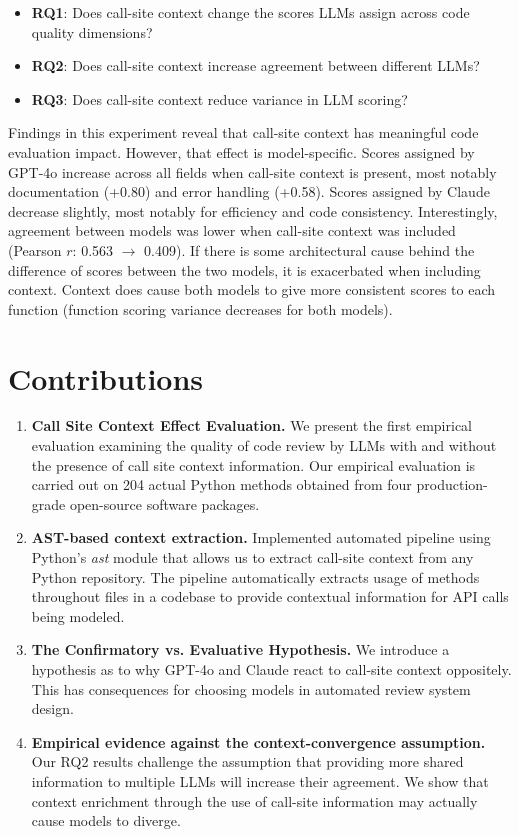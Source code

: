 \documentclass[12pt]{report}
\begin{document}
\begin{itemize}
    \item \textbf{RQ1}: Does call-site context change the scores LLMs assign across code quality dimensions?
    \item \textbf{RQ2}: Does call-site context increase agreement between different LLMs?
    \item \textbf{RQ3}: Does call-site context reduce variance in LLM scoring?
\end{itemize}

Findings in this experiment reveal that call-site context has meaningful code evaluation impact. However, that effect is model-specific. Scores assigned by GPT-4o increase across all fields when call-site context is present, most notably documentation (+0.80) and error handling (+0.58). Scores assigned by Claude decrease slightly, most notably for efficiency and code consistency. Interestingly, agreement between models was lower when call-site context was included (Pearson $r$: 0.563 $\to$ 0.409). If there is some architectural cause behind the difference of scores between the two models, it is exacerbated when including context. Context does cause both models to give more consistent scores to each function (function scoring variance decreases for both models).

\section{Contributions}

\begin{enumerate}
    \item \textbf{Call Site Context Effect Evaluation. } We present the first empirical evaluation examining the quality of code review by LLMs with and without the presence of call site context information. Our empirical evaluation is carried out on 204 actual Python methods obtained from four production-grade open-source software packages.

    \item \textbf{AST-based context extraction.} Implemented automated pipeline using Python's \textit{ast} module that allows us to extract call-site context from any Python repository. The pipeline automatically extracts usage of methods throughout files in a codebase to provide contextual information for API calls being modeled.

    \item \textbf{The Confirmatory vs. Evaluative Hypothesis.} We introduce a hypothesis as to why GPT-4o and Claude react to call-site context oppositely. This has consequences for choosing models in automated review system design.

    \item \textbf{Empirical evidence against the context-convergence assumption.} Our RQ2 results challenge the assumption that providing more shared information to multiple LLMs will increase their agreement. We show that context enrichment through the use of call-site information may actually cause models to diverge.
\end{enumerate}
\end{document}
